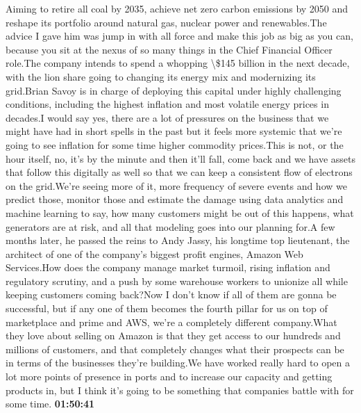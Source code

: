 \documentclass{article}%
\begin{document}
Aiming to retire all coal by 2035, achieve net zero carbon emissions by 2050 and reshape its portfolio around natural gas, nuclear power and renewables.The advice I gave him was jump in with all force and make this job as big as you can, because you sit at the nexus of so many things in the Chief Financial Officer role.The company intends to spend a whopping \textbackslash{}\$145 billion in the next decade, with the lion share going to changing its energy mix and modernizing its grid.Brian Savoy is in charge of deploying this capital under highly challenging conditions, including the highest inflation and most volatile energy prices in decades.I would say yes, there are a lot of pressures on the business that we might have had in short spells in the past but it feels more systemic that we're going to see inflation for some time higher commodity prices.This is not, or the hour itself, no, it's by the minute and then it'll fall, come back and we have assets that follow this digitally as well so that we can keep a consistent flow of electrons on the grid.We're seeing more of it, more frequency of severe events and how we predict those, monitor those and estimate the damage using data analytics and machine learning to say, how many customers might be out of this happens, what generators are at risk, and all that modeling goes into our planning for.A few months later, he passed the reins to Andy Jassy, his longtime top lieutenant, the architect of one of the company's biggest profit engines, Amazon Web Services.How does the company manage market turmoil, rising inflation and regulatory scrutiny, and a push by some warehouse workers to unionize all while keeping customers coming back?Now I don't know if all of them are gonna be successful, but if any one of them becomes the fourth pillar for us on top of marketplace and prime and AWS, we're a completely different company.What they love about selling on Amazon is that they get access to our hundreds and millions of customers, and that completely changes what their prospects can be in terms of the businesses they're building.We have worked really hard to open a lot more points of presence in ports and to increase our capacity and getting products in, but I think it's going to be something that companies battle with for some time.%
\textbf{01:50:41}%
\newline%
\end{document}
